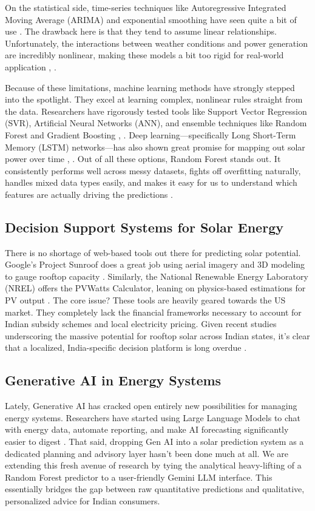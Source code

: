 \documentclass[conference]{IEEEtran}
\begin{document}
On the statistical side, time-series techniques like Autoregressive Integrated Moving Average (ARIMA) and exponential smoothing have seen quite a bit of use \cite{b15}. The drawback here is that they tend to assume linear relationships. Unfortunately, the interactions between weather conditions and power generation are incredibly nonlinear, making these models a bit too rigid for real-world application \cite{b7}, \cite{b18}.

Because of these limitations, machine learning methods have strongly stepped into the spotlight. They excel at learning complex, nonlinear rules straight from the data. Researchers have rigorously tested tools like Support Vector Regression (SVR), Artificial Neural Networks (ANN), and ensemble techniques like Random Forest and Gradient Boosting \cite{b4}, \cite{b19}. Deep learning---specifically Long Short-Term Memory (LSTM) networks---has also shown great promise for mapping out solar power over time \cite{b13}, \cite{b17}. Out of all these options, Random Forest stands out. It consistently performs well across messy datasets, fights off overfitting naturally, handles mixed data types easily, and makes it easy for us to understand which features are actually driving the predictions \cite{b8}.

\subsection{Decision Support Systems for Solar Energy}

There is no shortage of web-based tools out there for predicting solar potential. Google's Project Sunroof does a great job using aerial imagery and 3D modeling to gauge rooftop capacity \cite{b9}. Similarly, the National Renewable Energy Laboratory (NREL) offers the PVWatts Calculator, leaning on physics-based estimations for PV output \cite{b10}. The core issue? These tools are heavily geared towards the US market. They completely lack the financial frameworks necessary to account for Indian subsidy schemes and local electricity pricing. Given recent studies underscoring the massive potential for rooftop solar across Indian states, it's clear that a localized, India-specific decision platform is long overdue \cite{b20}.

\subsection{Generative AI in Energy Systems}

Lately, Generative AI has cracked open entirely new possibilities for managing energy systems. Researchers have started using Large Language Models to chat with energy data, automate reporting, and make AI forecasting significantly easier to digest \cite{b11}. That said, dropping Gen AI into a solar prediction system as a dedicated planning and advisory layer hasn't been done much at all. We are extending this fresh avenue of research by tying the analytical heavy-lifting of a Random Forest predictor to a user-friendly Gemini LLM interface. This essentially bridges the gap between raw quantitative predictions and qualitative, personalized advice for Indian consumers.
\end{document}
